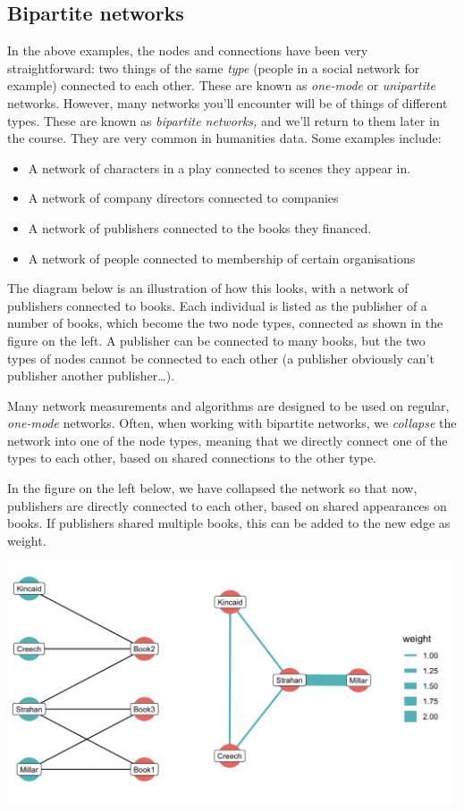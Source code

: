 \documentclass[
]{book}
\begin{document}
\hypertarget{bipartite-networks}{%
\subsection{Bipartite networks}\label{bipartite-networks}}

In the above examples, the nodes and connections have been very straightforward: two things of the same \emph{type} (people in a social network for example) connected to each other. These are known as \emph{one-mode} or \emph{unipartite} networks. However, many networks you'll encounter will be of things of different types. These are known as \emph{bipartite networks,} and we'll return to them later in the course. They are very common in humanities data. Some examples include:

\begin{itemize}
\item
  A network of characters in a play connected to scenes they appear in.
\item
  A network of company directors connected to companies
\item
  A network of publishers connected to the books they financed.
\item
  A network of people connected to membership of certain organisations
\end{itemize}

The diagram below is an illustration of how this looks, with a network of publishers connected to books. Each individual is listed as the publisher of a number of books, which become the two node types, connected as shown in the figure on the left. A publisher can be connected to many books, but the two types of nodes cannot be connected to each other (a publisher obviously can't publisher another publisher\ldots).

Many network measurements and algorithms are designed to be used on regular, \emph{one-mode} networks. Often, when working with bipartite networks, we \emph{collapse} the network into one of the node types, meaning that we directly connect one of the types to each other, based on shared connections to the other type.

In the figure on the left below, we have collapsed the network so that now, publishers are directly connected to each other, based on shared appearances on books. If publishers shared multiple books, this can be added to the new edge as weight.

\includegraphics[width=5.20833in,height=\textheight]{images/bipartite.png}
\end{document}

